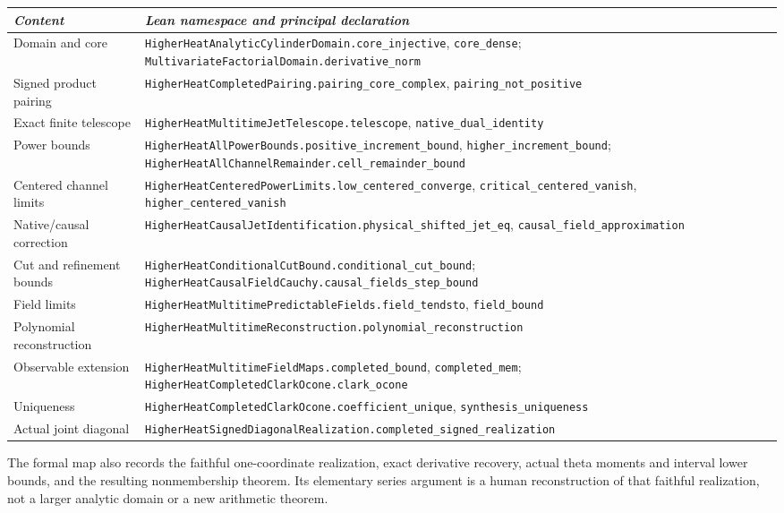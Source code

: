 \documentclass[11pt]{article}
\theoremstyle{remark}\newtheorem{remark}[theorem]{Remark}
\newcommand{\code}[1]{{\small\nolinkurl{#1}}}
\begin{document}
\begin{longtable}{@{}p{}p{}@{}}
\textit{Content}&\textit{Lean namespace and principal declaration}\\\hline
Domain and core&\code{HigherHeatAnalyticCylinderDomain.core_injective},
\code{core_dense}; \code{MultivariateFactorialDomain.derivative_norm}\\[3pt]
Signed product pairing&\code{HigherHeatCompletedPairing.pairing_core_complex},
\code{pairing_not_positive}\\[3pt]
Exact finite telescope&\code{HigherHeatMultitimeJetTelescope.telescope},
\code{native_dual_identity}\\[3pt]
Power bounds&\code{HigherHeatAllPowerBounds.positive_increment_bound},
\code{higher_increment_bound};
\code{HigherHeatAllChannelRemainder.cell_remainder_bound}\\[3pt]
Centered channel limits&\code{HigherHeatCenteredPowerLimits.low_centered_converge},
\code{critical_centered_vanish}, \code{higher_centered_vanish}\\[3pt]
Native/causal correction&\code{HigherHeatCausalJetIdentification.physical_shifted_jet_eq},
\code{causal_field_approximation}\\[3pt]
Cut and refinement bounds&\code{HigherHeatConditionalCutBound.conditional_cut_bound};
\code{HigherHeatCausalFieldCauchy.causal_fields_step_bound}\\[3pt]
Field limits&\code{HigherHeatMultitimePredictableFields.field_tendsto},
\code{field_bound}\\[3pt]
Polynomial reconstruction&\code{HigherHeatMultitimeReconstruction.polynomial_reconstruction}\\[3pt]
Observable extension&\code{HigherHeatMultitimeFieldMaps.completed_bound},
\code{completed_mem}; \code{HigherHeatCompletedClarkOcone.clark_ocone}\\[3pt]
Uniqueness&\code{HigherHeatCompletedClarkOcone.coefficient_unique},
\code{synthesis_uniqueness}\\[3pt]
Actual joint diagonal&\code{HigherHeatSignedDiagonalRealization.completed_signed_realization}\\
\end{longtable}

The formal map also records the faithful one-coordinate realization, exact derivative recovery, actual theta moments and interval lower bounds, and the resulting nonmembership theorem. Its elementary series argument is a human
reconstruction of that faithful realization, not a larger analytic
domain or a new arithmetic theorem.
\end{document}
